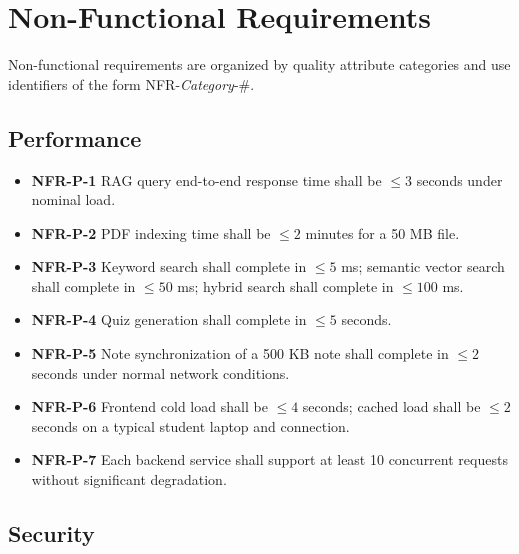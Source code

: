 \documentclass[12pt,a4paper]{article}
\begin{document}
\section{Non-Functional Requirements}

Non-functional requirements are organized by quality attribute categories and use identifiers of the form NFR-\textit{Category}-\#.

\subsection{Performance}

\begin{itemize}
    \item \textbf{NFR-P-1} RAG query end-to-end response time shall be $\leq 3$ seconds under nominal load.
    \item \textbf{NFR-P-2} PDF indexing time shall be $\leq 2$ minutes for a 50 MB file.
    \item \textbf{NFR-P-3} Keyword search shall complete in $\leq 5$ ms; semantic vector search shall complete in $\leq 50$ ms; hybrid search shall complete in $\leq 100$ ms.
    \item \textbf{NFR-P-4} Quiz generation shall complete in $\leq 5$ seconds.
    \item \textbf{NFR-P-5} Note synchronization of a 500 KB note shall complete in $\leq 2$ seconds under normal network conditions.
    \item \textbf{NFR-P-6} Frontend cold load shall be $\leq 4$ seconds; cached load shall be $\leq 2$ seconds on a typical student laptop and connection.
    \item \textbf{NFR-P-7} Each backend service shall support at least 10 concurrent requests without significant degradation.
\end{itemize}

\subsection{Security}
\end{document}
